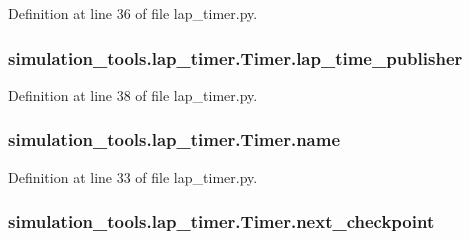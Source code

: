 Definition at line 36 of file lap\+\_\+timer.\+py.

\subsubsection[{\texorpdfstring{lap\+\_\+time\+\_\+publisher}{lap_time_publisher}}]{\setlength{\rightskip}{0pt plus 5cm}simulation\+\_\+tools.\+lap\+\_\+timer.\+Timer.\+lap\+\_\+time\+\_\+publisher}\hypertarget{classsimulation__tools_1_1lap__timer_1_1_timer_a2c9523f33bcf2a72cebb7ccc056a1f53}{}\label{classsimulation__tools_1_1lap__timer_1_1_timer_a2c9523f33bcf2a72cebb7ccc056a1f53}


Definition at line 38 of file lap\+\_\+timer.\+py.

\subsubsection[{\texorpdfstring{name}{name}}]{\setlength{\rightskip}{0pt plus 5cm}simulation\+\_\+tools.\+lap\+\_\+timer.\+Timer.\+name}\hypertarget{classsimulation__tools_1_1lap__timer_1_1_timer_a9bf911e55976cb1d04b10440cea407c1}{}\label{classsimulation__tools_1_1lap__timer_1_1_timer_a9bf911e55976cb1d04b10440cea407c1}


Definition at line 33 of file lap\+\_\+timer.\+py.

\subsubsection[{\texorpdfstring{next\+\_\+checkpoint}{next_checkpoint}}]{\setlength{\rightskip}{0pt plus 5cm}simulation\+\_\+tools.\+lap\+\_\+timer.\+Timer.\+next\+\_\+checkpoint}\hypertarget{classsimulation__tools_1_1lap__timer_1_1_timer_a74b19b620b1f59ce1d558524c275f4c3}{}\label{classsimulation__tools_1_1lap__timer_1_1_timer_a74b19b620b1f59ce1d558524c275f4c3}



